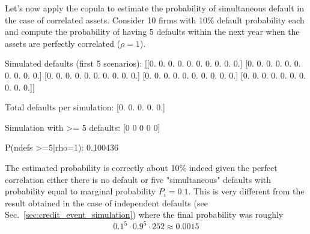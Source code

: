 Let's now apply the copula to estimate the probability of simultaneous default in the case of correlated assets.
Consider 10 firms with 10\% default probability each and compute the probability of having 5 defaults within the next year when the assets are perfectly correlated ($\rho=1$).
%



\begin{ioutput}
Simulated defaults (first 5 scenarios):
[[0. 0. 0. 0. 0. 0. 0. 0. 0. 0.]
[0. 0. 0. 0. 0. 0. 0. 0. 0. 0.]
[0. 0. 0. 0. 0. 0. 0. 0. 0. 0.]
[0. 0. 0. 0. 0. 0. 0. 0. 0. 0.]
[0. 0. 0. 0. 0. 0. 0. 0. 0. 0.]]

Total defaults per simulation:
[0. 0. 0. 0. 0.]

Simulation with >= 5 defaults:
[0 0 0 0 0]

P(ndefs >=5|rho=1): 0.100436
\end{ioutput}

The estimated probability is correctly about 10\% indeed given the perfect correlation either there is no default or five "simultaneous" defaults with probability equal to marginal probability $P_i = 0.1$.
This is very different from the result obtained in the case of independent defaults (see Sec.~\ref{sec:credit_event_simulation}) where the final probability was roughly 
$$
0.1^5 \cdot 0.9^5\cdot 252 \approx 0.0015
$$


%

